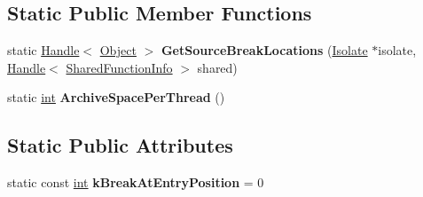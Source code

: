 \subsection*{Static Public Member Functions}
\begin{DoxyCompactItemize}
\item 
\mbox{\label{classv8_1_1internal_1_1Debug_a9180cb0989ea9532e8f096b59a8eddbb}} 
static \mbox{\hyperlink{classv8_1_1internal_1_1Handle}{Handle}}$<$ \mbox{\hyperlink{classv8_1_1internal_1_1Object}{Object}} $>$ {\bfseries Get\+Source\+Break\+Locations} (\mbox{\hyperlink{classv8_1_1internal_1_1Isolate}{Isolate}} $\ast$isolate, \mbox{\hyperlink{classv8_1_1internal_1_1Handle}{Handle}}$<$ \mbox{\hyperlink{classv8_1_1internal_1_1SharedFunctionInfo}{Shared\+Function\+Info}} $>$ shared)
\item 
\mbox{\label{classv8_1_1internal_1_1Debug_adb09bdbce4e9edfc915eef0b59574825}} 
static \mbox{\hyperlink{classint}{int}} {\bfseries Archive\+Space\+Per\+Thread} ()
\end{DoxyCompactItemize}
\subsection*{Static Public Attributes}
\begin{DoxyCompactItemize}
\item 
\mbox{\label{classv8_1_1internal_1_1Debug_a6edcbeaf0e52de2b460520c1d01588a7}} 
static const \mbox{\hyperlink{classint}{int}} {\bfseries k\+Break\+At\+Entry\+Position} = 0
\end{DoxyCompactItemize}
